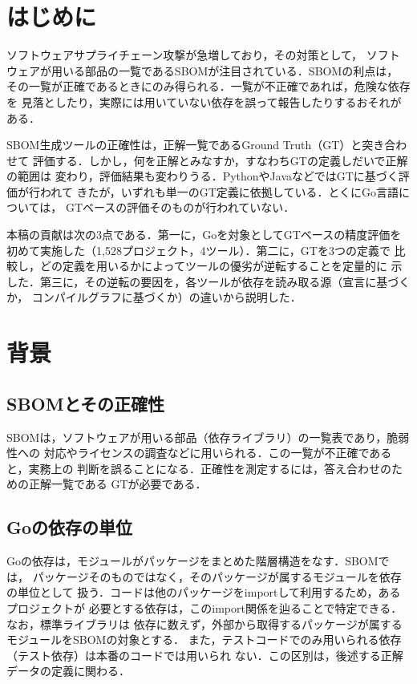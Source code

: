\documentclass{css}
\begin{document}
\section{はじめに}
ソフトウェアサプライチェーン攻撃が急増しており，その対策として，
ソフトウェアが用いる部品の一覧であるSBOMが注目されている．SBOMの利点は，
その一覧が正確であるときにのみ得られる．一覧が不正確であれば，危険な依存を
見落としたり，実際には用いていない依存を誤って報告したりするおそれがある．

SBOM生成ツールの正確性は，正解一覧であるGround Truth（GT）と突き合わせて
評価する．しかし，何を正解とみなすか，すなわちGTの定義しだいで正解の範囲は
変わり，評価結果も変わりうる．PythonやJavaなどではGTに基づく評価が行われて
きたが\cite{yu2024,balliu2023,rabbi2024,zhou2026}，いずれも単一のGT定義に依拠している．とくにGo言語については，
GTベースの評価そのものが行われていない．

本稿の貢献は次の3点である．第一に，Goを対象としてGTベースの精度評価を
初めて実施した（1{,}528プロジェクト，4ツール）．第二に，GTを3つの定義で
比較し，どの定義を用いるかによってツールの優劣が逆転することを定量的に
示した．第三に，その逆転の要因を，各ツールが依存を読み取る源（宣言に基づくか，
コンパイルグラフに基づくか）の違いから説明した．

\section{背景}

\subsection{SBOMとその正確性}
SBOMは，ソフトウェアが用いる部品（依存ライブラリ）の一覧表であり，脆弱性への
対応やライセンスの調査などに用いられる．この一覧が不正確であると，実務上の
判断を誤ることになる．正確性を測定するには，答え合わせのための正解一覧である
GTが必要である．

\subsection{Goの依存の単位}
Goの依存は，モジュールがパッケージをまとめた階層構造をなす．SBOMでは，
パッケージそのものではなく，そのパッケージが属するモジュールを依存の単位として
扱う．コードは他のパッケージをimportして利用するため，あるプロジェクトが
必要とする依存は，このimport関係を辿ることで特定できる．なお，標準ライブラリは
依存に数えず，外部から取得するパッケージが属するモジュールをSBOMの対象とする．
また，テストコードでのみ用いられる依存（テスト依存）は本番のコードでは用いられ
ない．この区別は，後述する正解データの定義に関わる．
\end{document}
